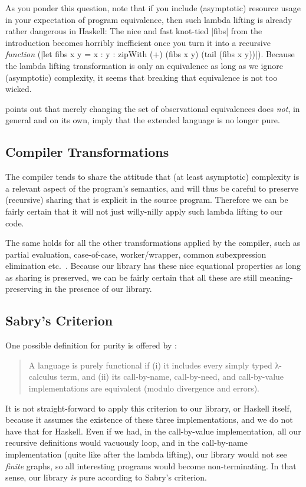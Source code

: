 \documentclass[manuscript,screen,acmsmall,nonacm]{acmart}
\begin{document}
As you ponder this question, note that if you include (asymptotic) resource usage in your expectation of program equivalence, then such lambda lifting is already rather dangerous in Haskell: The nice and fast knot-tied |fibs| from the introduction becomes horribly inefficient once you turn it into a recursive \emph{function} (|let fibs x y = x : y  : zipWith (+) (fibs x y) (tail (fibs x y))|). Because the lambda lifting transformation is only an equivalence as long as we ignore (asymptotic) complexity, it seems that breaking that equivalence is not too wicked.

 points out that merely changing the set of observational equivalences does \emph{not}, in general and on its own, imply that the extended language is no longer pure.

\subsection{Compiler Transformations}\label{sec:comptrans}

The compiler tends to share the attitude that (at least asymptotic) complexity is a relevant aspect of the program's semantics, and will thus be careful to preserve (recursive) sharing that is explicit in the source program. Therefore we can be fairly certain that it will not just willy-nilly apply such lambda lifting to our code.

The same holds for all the other transformations applied by the compiler, such as partial evaluation, case-of-case, worker/wrapper, common subexpression elimination etc.\ \citep{optimiser}. Because our library has these nice equational properties as long as sharing is preserved, we can be fairly certain that all these are still meaning-preserving in the presence of our library.

\subsection{Sabry's Criterion}

One possible definition for purity is offered by \citet{sabry}:
\begin{quote}
A language is purely functional if (i) it includes every simply typed λ-calculus term, and
(ii) its call-by-name, call-by-need, and call-by-value implementations are equivalent (modulo
divergence and errors).
\end{quote}

It is not straight-forward to apply this criterion to our library, or Haskell itself, because it assumes the existence of these three implementations, and we do not have that for Haskell. Even if we had, in the call-by-value implementation, all our recursive definitions would vacuously loop, and in the call-by-name implementation (quite like after the lambda lifting), our library would not see \emph{finite} graphs, so all interesting programs would become non-terminating. In that sense, our library \emph{is} pure according to Sabry’s criterion.
\end{document}
